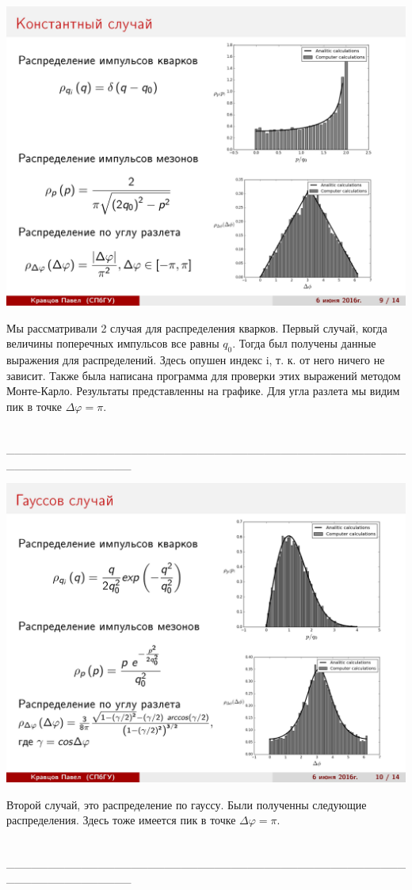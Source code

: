 \documentclass[14pt]{article}
\renewcommand{\phi}{\varphi}
\renewcommand{\line}{\\ \_\_\_\_\_\_\_\_\_\_\_\_\_\_\_\_\_\_\_\_\_\_\_\_\_\_\_\_\_\_\_\_\_\_\_\_\_\_\_\_\_\_\_\_\_\_\_\_\_\_\_\_\_\_\_\_\_\_\_\_\_\_\_ \\ }
\begin{document}
\begin{minipage}[h]{0.5\linewidth}
\includegraphics[width=1\linewidth]{page-09.jpg}
\end{minipage}
\begin{minipage}[h]{0.45\linewidth}
Мы рассматривали 2 случая для распределения кварков. Первый случай, когда величины поперечных импульсов все равны $q_0$. Тогда был получены данные выражения для распределений. Здесь опушен индекс i, т. к. от него ничего не зависит. Также была написана программа для проверки этих выражений методом Монте-Карло. Результаты представленны на графике. Для угла разлета мы видим пик в точке $\Delta \phi = \pi$.
\end{minipage}
\line

\newpage
$$$$
$$$$
$$$$
$$$$

\begin{minipage}[h]{0.5\linewidth}
\includegraphics[width=1\linewidth]{page-10.jpg}
\end{minipage}
\begin{minipage}[h]{0.45\linewidth}
Второй случай, это распределение по гауссу. Были полученны следующие распределения. Здесь тоже имеется пик в точке $\Delta \phi = \pi$.
\end{minipage}
\line
\end{document}
